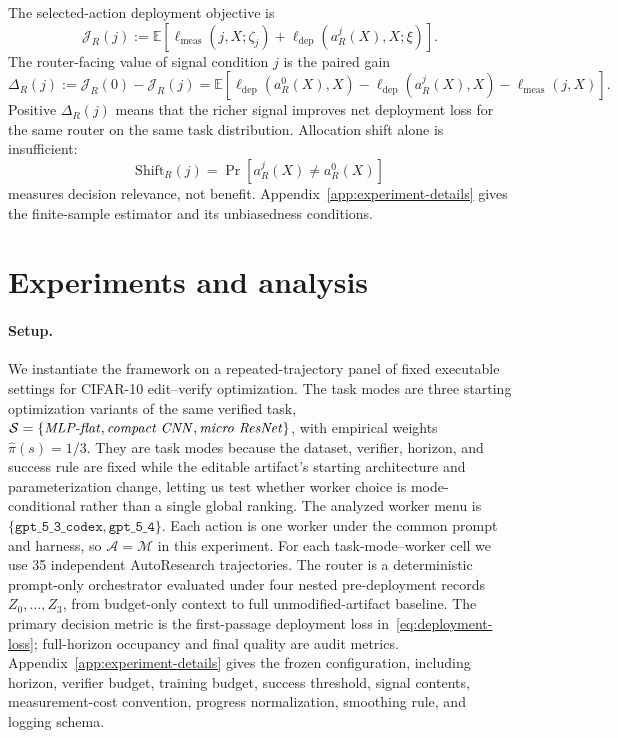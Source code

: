 \documentclass{article}
\newcommand{\cA}{\mathcal{A}}
\newcommand{\cM}{\mathcal{M}}
\newcommand{\cS}{\mathcal{S}}
\newcommand{\E}{\mathbb{E}}
\newcommand{\J}{\mathcal{J}}
\begin{document}
The selected-action deployment objective is
\begin{equation}
\J_R(j)
:=
\E\left[
\ell_{\mathrm{meas}}(j,X;\zeta_j)
+\ell_{\mathrm{dep}}(a_R^j(X),X;\xi)
\right].
\label{eq:router-objective}
\end{equation}
The router-facing value of signal condition $j$ is the paired gain
\begin{equation}
\Delta_R(j)
:=
\J_R(0)-\J_R(j)
=
\E\!\left[
\ell_{\mathrm{dep}}(a_R^0(X),X)
-
\ell_{\mathrm{dep}}(a_R^j(X),X)
-
\ell_{\mathrm{meas}}(j,X)
\right].
\label{eq:router-gain}
\end{equation}
Positive $\Delta_R(j)$ means that the richer signal improves net deployment loss for the same router on the same task distribution.
Allocation shift alone is insufficient:
\[
\mathrm{Shift}_R(j)=\Pr[a_R^j(X)\neq a_R^0(X)]
\]
measures decision relevance, not benefit.
Appendix~\ref{app:experiment-details} gives the finite-sample estimator and its unbiasedness conditions.


\section{Experiments and analysis}
\label{sec:experiments}

\paragraph{Setup.}
We instantiate the framework on a repeated-trajectory panel of fixed executable settings for CIFAR-10 edit--verify optimization.
The task modes are three starting optimization variants of the same verified task, \(\cS=\{\text{\textit{MLP-flat}},\text{\textit{compact CNN}},\text{\textit{micro ResNet}}\}\), with empirical weights \(\hat\pi(s)=1/3\).
They are task modes because the dataset, verifier, horizon, and success rule are fixed while the editable artifact's starting architecture and parameterization change, letting us test whether worker choice is mode-conditional rather than a single global ranking.
The analyzed worker menu is \(\{\texttt{gpt\_5\_3\_codex},\texttt{gpt\_5\_4}\}\).
Each action is one worker under the common prompt and harness, so \(\cA=\cM\) in this experiment.
For each task-mode--worker cell we use 35 independent AutoResearch trajectories.
The router is a deterministic prompt-only orchestrator evaluated under four nested pre-deployment records \(Z_0,\ldots,Z_3\), from budget-only context to full unmodified-artifact baseline.
The primary decision metric is the first-passage deployment loss in~\eqref{eq:deployment-loss}; full-horizon occupancy and final quality are audit metrics.
Appendix~\ref{app:experiment-details} gives the frozen configuration, including horizon, verifier budget, training budget, success threshold, signal contents, measurement-cost convention, progress normalization, smoothing rule, and logging schema.
\end{document}

